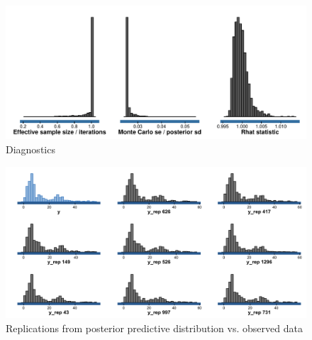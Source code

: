 \begin{figure}
\centering
	\includegraphics[scale=0.67]{sections/figs/ck_diagnostics}
\caption{Diagnostics}
\label{fig:ck_diagnostics}
\end{figure}



\begin{figure}
\centering
	\includegraphics[scale=0.25]{sections/figs/ck_pp_hists}
\caption{Replications from posterior predictive distribution vs. observed data}
\label{fig:ck_pp_hists}
\end{figure}

